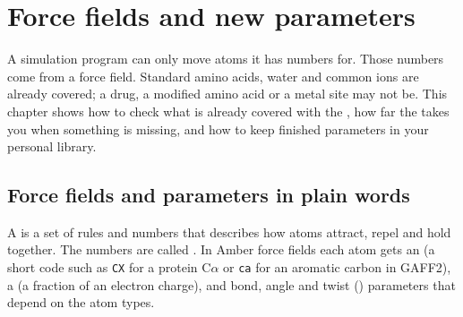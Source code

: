 \chapter{Force fields and new parameters}
\label{ch:forcefields}

A simulation program can only move atoms it has numbers for. Those numbers
come from a force field. Standard amino acids, water and common ions are
already covered; a drug, a modified amino acid or a metal site may not be.
This chapter shows how to check what is already covered with the
, how far the
 takes you when something is missing,
and how to keep finished parameters in your personal library.

\begin{glance}
\end{glance}

\section{Force fields and parameters in plain words}
\label{sec:forcefields-words}

A  is a set of rules and numbers that describes how atoms
attract, repel and hold together. The numbers are called
. In Amber force fields each atom gets an 
(a short code such as \texttt{CX} for a protein C$\alpha$ or \texttt{ca} for an
aromatic carbon in GAFF2), a  (a fraction of an electron
charge), and bond, angle and twist () parameters that depend on
the atom types.

